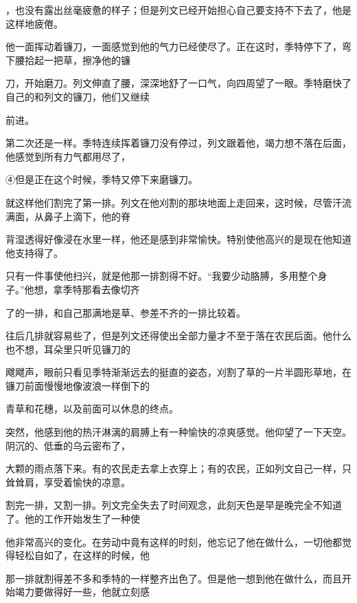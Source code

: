 \documentclass[UTF8,a4paper,fontset=fandol]{ctexart}
\begin{document}
，也没有露出丝毫疲惫的样子；但是列文已经开始担心自己要支持不下去了，他是这样地疲倦。\par
\hspace*{1.8em}他一面挥动着镰刀，一面感觉到他的气力已经使尽了。正在这时，季特停下了，弯下腰拾起一把草，擦净他的镰\par
刀，开始磨刀。列文伸直了腰，深深地舒了一口气，向四周望了一眼。季特磨快了自己的和列文的镰刀，他们又继续\par
前进。\par
\hspace*{1.8em}第二次还是一样。季特连续挥着镰刀没有停过，列文跟着他，竭力想不落在后面，他感觉到所有力气都用尽了，\par
④但是正在这个时候，季特又停下来磨镰刀。\par
\clearpage
\hspace*{1.8em}就这样他们割完了第一排。列文在他刈割的那块地面上走回来，这时候，尽管汗流满面，从鼻子上滴下，他的脊\par
背湿透得好像浸在水里一样，他还是感到非常愉快。特别使他高兴的是现在他知道他支持得了。\par
\hspace*{1.8em}只有一件事使他扫兴，就是他那一排割得不好。“我要少动胳膊，多用整个身子。”他想，拿季特那看去像切齐\par
了的一排，和自己那满地是草、参差不齐的一排比较着。\par
\hspace*{1.8em}往后几排就容易些了，但是列文还得使出全部力量才不至于落在农民后面。他什么也不想，耳朵里只听见镰刀的\par
飕飕声，眼前只看见季特渐渐远去的挺直的姿态，刈割了草的一片半圆形草地，在镰刀前面慢慢地像波浪一样倒下的\par
青草和花穗，以及前面可以休息的终点。\par
\hspace*{1.8em}突然，他感到他的热汗淋漓的肩膊上有一种愉快的凉爽感觉。他仰望了一下天空。阴沉的、低垂的乌云密布了，\par
大颗的雨点落下来。有的农民走去拿上衣穿上；有的农民，正如列文自己一样，只耸耸肩，享受着愉快的凉意。\par
\hspace*{1.8em}割完一排，又割一排。列文完全失去了时间观念，此刻天色是早是晚完全不知道了。他的工作开始发生了一种使\par
他非常高兴的变化。在劳动中竟有这样的时刻，他忘记了他在做什么，一切他都觉得轻松自如了，在这样的时候，他\par
那一排就割得差不多和季特的一样整齐出色了。但是他一想到他在做什么，而且开始竭力要做得好一些，他就立刻感\par
\end{document}

